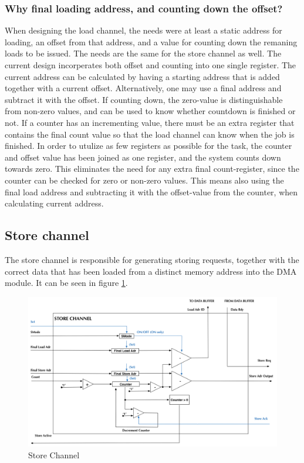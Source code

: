 \begin{appendix}
\subsubsection{Why final loading address, and counting down the offset?}
When designing the load channel, the needs were at least a static address for loading, an offset from that address, and a value for counting down the remaning loads to be issued.
The needs are the same for the store channel as well.
The current design incorperates both offset and counting into one single register.
The current address can be calculated by having a starting address that is added together with a current offset.
Alternatively, one may use a final address and subtract it with the offset.
If counting down, the zero-value is distinguishable from non-zero values, and can be used to know whether countdown is finished or not.
If a counter has an incrementing value, there must be an extra register that contains the final count value so that the load channel can know when the job is finished.
In order to utulize as few registers as possible for the task, the counter and offset value has been joined as one register, and the system counts down towards zero.
This eliminates the need for any extra final count-register, since the counter can be checked for zero or non-zero values.
This means also using the final load address and subtracting it with the offset-value from the counter, when calculating current address.

\subsection{Store channel}
The store channel is responsible for generating storing requests, together with the correct data that has been loaded from a distinct memory address into the DMA module.
It can be seen in figure \ref{fig:storeChannel}.


\begin{figure}[h!]
    \centering
    \includegraphics[width=1.0\textwidth]{Figures/DMA/StoreChannel}
    \caption{Store Channel}
    \label{fig:storeChannel}
\end{figure}


\end{appendix}
